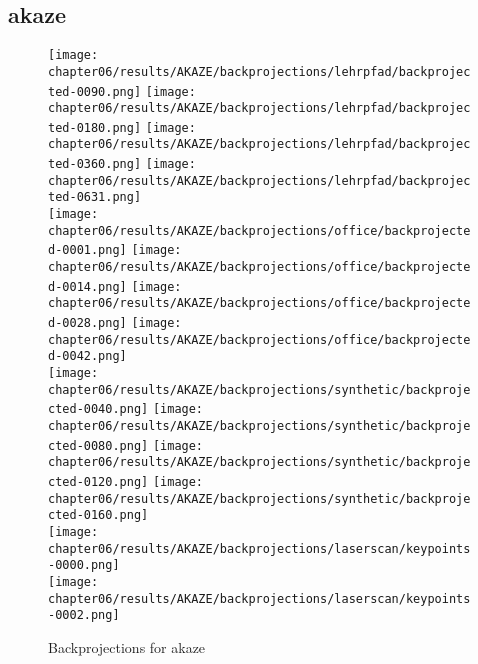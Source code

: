 \subsection{\acrshort{akaze}}\label{sec:backprojection_akaze}
\begin{figure}[H]
    \texttt{[image: chapter06/results/AKAZE/backprojections/lehrpfad/backprojected-0090.png]}%
    \texttt{[image: chapter06/results/AKAZE/backprojections/lehrpfad/backprojected-0180.png]}%
    \texttt{[image: chapter06/results/AKAZE/backprojections/lehrpfad/backprojected-0360.png]}%
    \texttt{[image: chapter06/results/AKAZE/backprojections/lehrpfad/backprojected-0631.png]}\\
    \texttt{[image: chapter06/results/AKAZE/backprojections/office/backprojected-0001.png]}%
    \texttt{[image: chapter06/results/AKAZE/backprojections/office/backprojected-0014.png]}%
    \texttt{[image: chapter06/results/AKAZE/backprojections/office/backprojected-0028.png]}%
    \texttt{[image: chapter06/results/AKAZE/backprojections/office/backprojected-0042.png]}\\
    \texttt{[image: chapter06/results/AKAZE/backprojections/synthetic/backprojected-0040.png]}%
    \texttt{[image: chapter06/results/AKAZE/backprojections/synthetic/backprojected-0080.png]}%
    \texttt{[image: chapter06/results/AKAZE/backprojections/synthetic/backprojected-0120.png]}%
    \texttt{[image: chapter06/results/AKAZE/backprojections/synthetic/backprojected-0160.png]}\\
    \texttt{[image: chapter06/results/AKAZE/backprojections/laserscan/keypoints-0000.png]}\\
    \texttt{[image: chapter06/results/AKAZE/backprojections/laserscan/keypoints-0002.png]}\\
    \caption{Backprojections for \acrshort{akaze}}
\end{figure}
